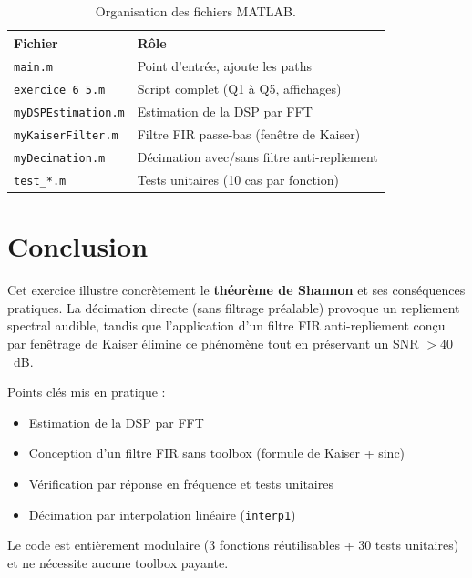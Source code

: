 \documentclass[12pt,a4paper]{article}
\begin{document}
\begin{table}[H]
    \centering
    \begin{tabular}{ll}
        \toprule
        \textbf{Fichier} & \textbf{R\^ole} \\
        \midrule
        \texttt{main.m}             & Point d'entr\'ee, ajoute les paths \\
        \texttt{exercice\_6\_5.m}   & Script complet (Q1 \`a Q5, affichages) \\
        \texttt{myDSPEstimation.m}  & Estimation de la DSP par FFT \\
        \texttt{myKaiserFilter.m}   & Filtre FIR passe-bas (fen\^etre de Kaiser) \\
        \texttt{myDecimation.m}     & D\'ecimation avec/sans filtre anti-repliement \\
        \texttt{test\_*.m}          & Tests unitaires (10 cas par fonction) \\
        \bottomrule
    \end{tabular}
    \caption{Organisation des fichiers MATLAB.}
\end{table}

\section{Conclusion}

Cet exercice illustre concr\`etement le \textbf{th\'eor\`eme de Shannon} et ses
cons\'equences pratiques. La d\'ecimation directe (sans filtrage pr\'ealable)
provoque un repliement spectral audible, tandis que l'application d'un filtre
FIR anti-repliement con\c{c}u par fen\^etrage de Kaiser \'elimine ce
ph\'enom\`ene tout en pr\'eservant un SNR $> 40$~dB.

Points cl\'es mis en pratique :
\begin{itemize}
    \item Estimation de la DSP par FFT
    \item Conception d'un filtre FIR sans toolbox (formule de Kaiser + sinc)
    \item V\'erification par r\'eponse en fr\'equence et tests unitaires
    \item D\'ecimation par interpolation lin\'eaire (\texttt{interp1})
\end{itemize}

Le code est enti\`erement modulaire (3 fonctions r\'eutilisables + 30 tests
unitaires) et ne n\'ecessite aucune toolbox payante.
\end{document}
